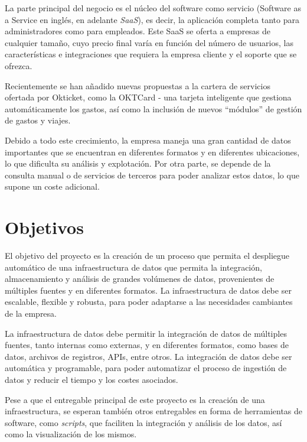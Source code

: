 La parte principal del negocio es el núcleo del software como servicio (Software as a
Service en inglés, en adelante \textit{SaaS}), es decir, la aplicación completa tanto
para administradores como para empleados. Este SaaS se oferta a empresas de cualquier
tamaño, cuyo precio final varía en función del número de usuarios, las características
e integraciones que requiera la empresa cliente y el soporte que se ofrezca.

Recientemente se han añadido nuevas propuestas a la cartera de servicios ofertada por
Okticket, como la OKTCard {-} una tarjeta inteligente que gestiona automáticamente los gastos,
así como la inclusión de nuevos ``módulos'' de gestión de gastos y viajes.

Debido a todo este crecimiento, la empresa maneja una gran cantidad de datos importantes que se
encuentran en diferentes formatos y en diferentes ubicaciones, lo que dificulta su análisis y
explotación. Por otra parte, se depende de la consulta manual o de servicios de terceros para
poder analizar estos datos, lo que supone un coste adicional.

\section{Objetivos}\label{sec:objetivos}
El objetivo del proyecto es la creación de un proceso que permita el despliegue automático de una
infraestructura de datos que permita la integración, almacenamiento y análisis de grandes volúmenes
de datos, provenientes de múltiples fuentes y en diferentes formatos. La infraestructura de datos
debe ser escalable, flexible y robusta, para poder adaptarse a las necesidades cambiantes de la empresa.

La infraestructura de datos debe permitir la integración de datos de múltiples fuentes, tanto
internas como externas, y en diferentes formatos, como bases de datos, archivos de registros, APIs,
entre otros. La integración de datos debe ser automática y programable, para poder automatizar el
proceso de ingestión de datos y reducir el tiempo y los costes asociados.

Pese a que el entregable principal de este proyecto es la creación de una infraestructura, se
esperan también otros entregables en forma de herramientas de software, como \textit{scripts},
que faciliten la integración y análisis de los datos, así como la visualización de los mismos.
